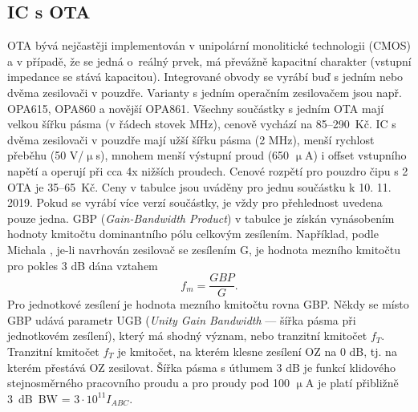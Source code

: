 \subsection{IC s OTA}
OTA bývá nejčastěji implementován v unipolární monolitické technologii (CMOS) a v případě, že se jedná o~reálný prvek, má převážně kapacitní charakter (vstupní impedance se stává kapacitou). Integrované obvody se vyrábí buď s jedním nebo dvěma zesilovači v pouzdře. Varianty s jedním operačním zesilovačem jsou např. OPA615, OPA860 a novější OPA861. Všechny součástky s jedním OTA mají velkou šířku pásma (v řádech stovek MHz), cenově vychází na 85--290~Kč. IC s dvěma zesilovači v pouzdře mají užší šířku pásma (2 MHz), menší rychlost přeběhu (50 V/$\upmu$s), mnohem menší výstupní proud (650 $\upmu$A) i offset vstupního napětí a operují při cca 4x nižších proudech. Cenové rozpětí pro pouzdro čipu s 2 OTA je 35--65~Kč. Ceny v tabulce jsou uváděny pro jednu součástku k 10. 11. 2019. Pokud se vyrábí více verzí součástky, je vždy pro přehlednost uvedena pouze jedna. GBP (\textit{Gain-Bandwidth Product}) v tabulce je získán vynásobením hodnoty kmitočtu dominantního pólu celkovým zesílením. Například, podle Michala \cite{14}, je-li navrhován zesilovač se zesílením G, je hodnota mezního kmitočtu pro pokles 3 dB dána vztahem
\begin{equation}
f_m = \frac{GBP}{G}.
\end{equation}
\noindent Pro jednotkové zesílení je hodnota mezního kmitočtu rovna GBP. Někdy se místo GBP udává parametr UGB (\textit{Unity Gain Bandwidth} --- šířka pásma při jednotkovém zesílení), který má shodný význam, nebo tranzitní kmitočet $f_T$. Tranzitní kmitočet $f_T$ je kmitočet, na kterém klesne zesílení OZ na 0 dB, tj. na kterém přestává OZ zesilovat. Šířka pásma s útlumem 3 dB je funkcí klidového stejnosměrného pracovního proudu a pro proudy pod 100 $\upmu$A je platí přibližně 3~dB\ BW = $3 \cdot 10^{11} I_{ABC}$.
\renewcommand{\arraystretch}{1.5}
